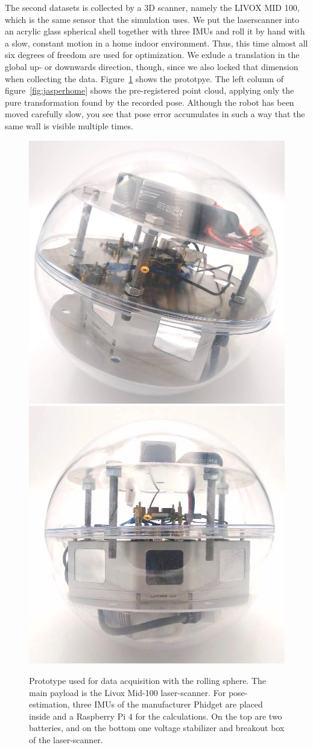 The second datasets is collected by a 3D scanner, namely the LIVOX MID 100, which is the same sensor that the simulation uses.
We put the laserscanner into an acrylic glass spherical shell together with three IMUs and roll it by hand with a slow, constant motion in a home indoor environment.
Thus, this time almost all six degrees of freedom are used for optimization.
We exlude a translation in the global up- or downwards direction, though, since we also locked that dimension when collecting the data.
Figure~\ref{fig:prototype} shows the prototpye.
The left column of figure~\ref{fig:jasperhome} shows the pre-registered point cloud, applying only the pure transformation found by the recorded pose.
Although the robot has been moved carefully slow, you see that pose error accumulates in such a way that the same wall is visible multiple times.   

\begin{figure}
  \includegraphics[width=0.49\linewidth]{./images/photoReal1.jpeg}
  \includegraphics[width=0.50\linewidth]{./images/photoReal3.jpeg}
  \caption{Prototype used for data acquisition with the rolling sphere. The main payload is the Livox Mid-100 laser-scanner. For pose-estimation, three IMUs of the manufacturer Phidget are placed inside and a Raspberry Pi 4 for the calculations. On the top are two batteries, and on the bottom one voltage stabilizer and breakout box of the laser-scanner. }
  \label{fig:prototype}
\end{figure}


